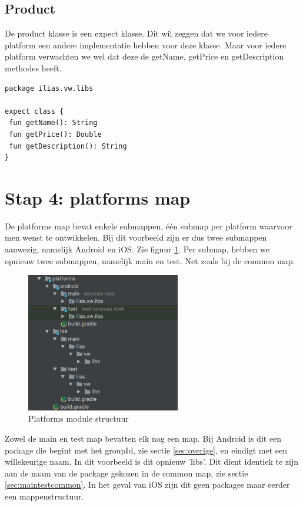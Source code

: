 \subsection{Product}
De product klasse is een expect klasse. Dit wil zeggen dat we voor iedere platform een andere implementatie hebben voor deze klasse. Maar voor iedere platform verwachten we wel dat deze de getName, getPrice en getDescription methodes heeft.

\begin{lstlisting}
package ilias.vw.libs

expect class {
 fun getName(): String
 fun getPrice(): Double
 fun getDescription(): String
}
\end{lstlisting}

\section{Stap 4: platforms map}
De platforms map bevat enkele submappen, één submap per platform waarvoor men wenst te ontwikkelen. Bij dit voorbeeld zijn er dus twee submappen aanwezig, namelijk Android en iOS. Zie figuur \ref{fig:stap4-structuur}. Per submap, hebben we opnieuw twee submappen, namelijk main en test. Net zoals bij de common map. 

\begin{figure} [ht]
	\centering
	\includegraphics[width=0.60\textwidth]{img/stap4-structuur.png}
	\caption{Platforms module structuur}
	\label{fig:stap4-structuur}
\end{figure}

Zowel de main en test map bevatten elk nog een map. Bij Android is dit een package die begint met het groupId, zie sectie \ref{sec:overige}, en eindigt met een willekeurige naam. In dit voorbeeld is dit opnieuw 'libs'. Dit dient identiek te zijn aan de naam van de package gekozen in de common map, zie sectie \ref{sec:maintestcommon}. In het geval van iOS zijn dit geen packages maar eerder een mappenstructuur.

